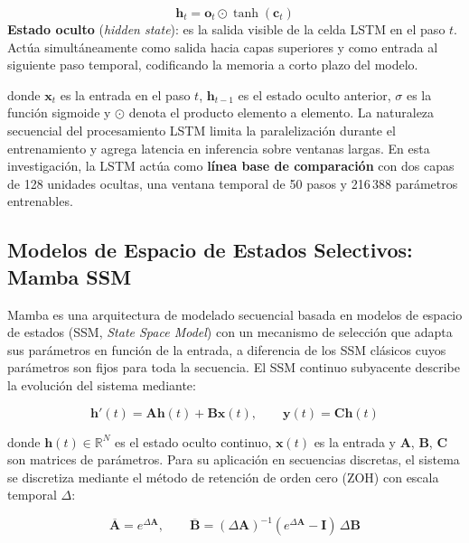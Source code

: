 \begin{equation}
\mathbf{h}_t = \mathbf{o}_t \odot \tanh(\mathbf{c}_t)
\end{equation}
\noindent\textbf{Estado oculto} (\textit{hidden state}): es la salida visible de la celda LSTM en el paso $t$. Actúa simultáneamente como salida hacia capas superiores y como entrada al siguiente paso temporal, codificando la memoria a corto plazo del modelo.

\noindent donde $\mathbf{x}_t$ es la entrada en el paso $t$, $\mathbf{h}_{t-1}$ es el estado oculto anterior, $\sigma$ es la función sigmoide y $\odot$ denota el producto elemento a elemento. La naturaleza secuencial del procesamiento LSTM limita la paralelización durante el entrenamiento y agrega latencia en inferencia sobre ventanas largas. En esta investigación, la LSTM actúa como \textbf{línea base de comparación} con dos capas de 128 unidades ocultas, una ventana temporal de 50 pasos y 216\,388 parámetros entrenables.

\subsection{Modelos de Espacio de Estados Selectivos: Mamba SSM}

Mamba es una arquitectura de modelado secuencial basada en modelos de espacio de estados (SSM, \textit{State Space Model}) con un mecanismo de selección que adapta sus parámetros en función de la entrada, a diferencia de los SSM clásicos cuyos parámetros son fijos para toda la secuencia. El SSM continuo subyacente describe la evolución del sistema mediante:

\begin{equation}
\mathbf{h}'(t) = \mathbf{A}\mathbf{h}(t) + \mathbf{B}\mathbf{x}(t), \qquad \mathbf{y}(t) = \mathbf{C}\mathbf{h}(t)
\end{equation}

\noindent donde $\mathbf{h}(t) \in \mathbb{R}^N$ es el estado oculto continuo, $\mathbf{x}(t)$ es la entrada y $\mathbf{A}$, $\mathbf{B}$, $\mathbf{C}$ son matrices de parámetros. Para su aplicación en secuencias discretas, el sistema se discretiza mediante el método de retención de orden cero (ZOH) con escala temporal $\Delta$:

\begin{equation}
\overline{\mathbf{A}} = e^{\Delta \mathbf{A}}, \qquad \overline{\mathbf{B}} = (\Delta\mathbf{A})^{-1}(e^{\Delta\mathbf{A}} - \mathbf{I})\,\Delta\mathbf{B}
\end{equation}

